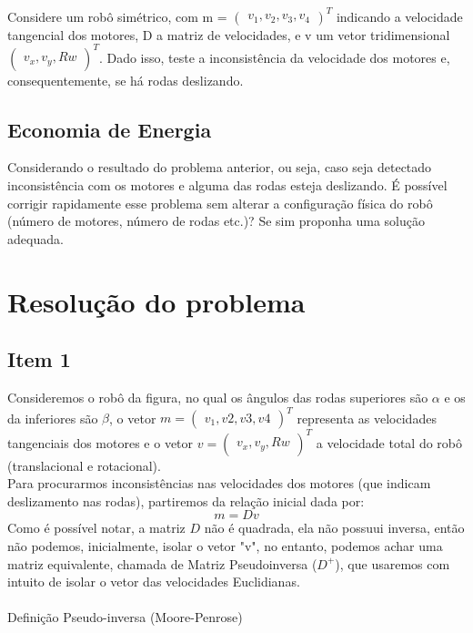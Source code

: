 \documentclass{article}
\begin{document}
Considere um robô simétrico, com m = $\begin{pmatrix}v_{1},v_{2},v_{3},v_{4} \end{pmatrix}^T$ indicando a velocidade tangencial dos motores,
D a matriz de velocidades, e v um vetor tridimensional $\begin{pmatrix} v_{x},v_{y},Rw \end{pmatrix}^T$.
Dado isso, teste a inconsistência da velocidade dos motores e, consequentemente, se há rodas deslizando.

\subsection{Economia de Energia}

Considerando o resultado do problema anterior, ou seja, caso seja detectado inconsistência com os motores e alguma das rodas esteja deslizando.
É possível corrigir rapidamente esse problema sem alterar a configuração física do robô (número de motores, número de rodas etc.)? Se sim proponha uma solução adequada.

\section{Resolução do problema}
\subsection{Item 1}

Consideremos o robô da figura, no qual os ângulos das rodas superiores são $\alpha$ e os da inferiores são $\beta$, o vetor $m = \begin{pmatrix} v_{1},v2,v3,v4 \end{pmatrix}^T$ representa
as velocidades tangenciais dos motores e o vetor $v = \begin{pmatrix} v_{x},v_{y},Rw \end{pmatrix}^T$ a velocidade total do robô (translacional e rotacional).
\\ Para procurarmos inconsistências nas velocidades dos motores (que indicam deslizamento nas rodas), partiremos da relação inicial dada por:
\[m = Dv\]
Como é possível notar, a matriz $D$ não é quadrada, ela não possuui inversa, então não podemos, inicialmente, isolar o vetor "v", no entanto, podemos achar uma matriz equivalente, chamada de Matriz Pseudoinversa ($D^+$), que usaremos com intuito de isolar o vetor das velocidades Euclidianas.
\\ \\ Definição Pseudo-inversa (Moore-Penrose)
\end{document}
